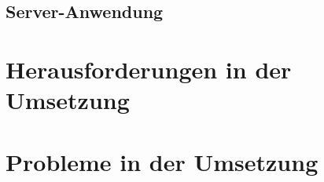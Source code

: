 \subsection{Server-Anwendung}

\section{Herausforderungen in der Umsetzung}











\section{Probleme in der Umsetzung}


